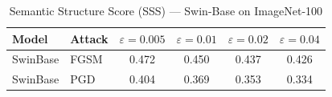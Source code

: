 \begin{table}[h]
\centering
\caption{Semantic Structure Score (SSS) — Swin-Base on ImageNet-100}
\begin{tabular}{llcccc}
\toprule
Model & Attack & $\varepsilon=0.005$ & $\varepsilon=0.01$ & $\varepsilon=0.02$ & $\varepsilon=0.04$ \\
\midrule
SwinBase & FGSM & 0.472 & 0.450 & 0.437 & 0.426 \\
SwinBase & PGD & 0.404 & 0.369 & 0.353 & 0.334 \\
\bottomrule
\end{tabular}
\end{table}